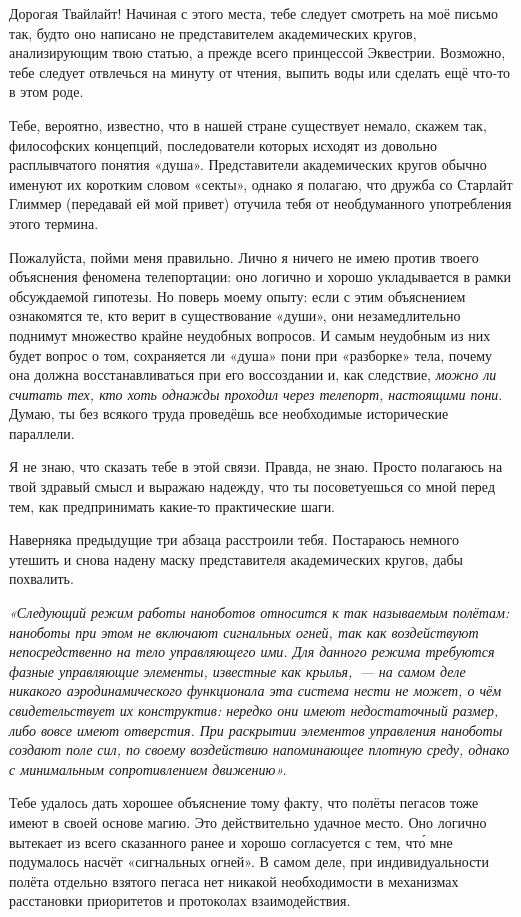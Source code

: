 \documentclass[fontsize=11pt,a5paper,titlepage=firstcover]{scrbook}
\begin{document}
Дорогая Твайлайт! Начиная с этого места, тебе следует смотреть на моё письмо так, будто оно написано не представителем академических кругов, анализирующим твою статью, а прежде всего принцессой Эквестрии. Возможно, тебе следует отвлечься на минуту от чтения, выпить воды или сделать ещё что-то в этом роде.

Тебе, вероятно, известно, что в нашей стране существует немало, скажем так, философских концепций, последователи которых исходят из довольно расплывчатого понятия «душа». Представители академических кругов обычно именуют их коротким словом «секты», однако я полагаю, что дружба со Старлайт Глиммер (передавай ей мой привет) отучила тебя от необдуманного употребления этого термина.

Пожалуйста, пойми меня правильно. Лично я ничего не имею против твоего объяснения феномена телепортации: оно логично и хорошо укладывается в рамки обсуждаемой гипотезы. Но поверь моему опыту: если с этим объяснением ознакомятся те, кто верит в существование «души», они незамедлительно поднимут множество крайне неудобных вопросов. И самым неудобным из них будет вопрос о том, сохраняется ли «душа» пони при «разборке» тела, почему она должна восстанавливаться при его воссоздании и, как следствие, \emph{можно ли считать тех, кто хоть однажды проходил через телепорт, настоящими пони}. Думаю, ты без всякого труда проведёшь все необходимые исторические параллели.

Я не знаю, что сказать тебе в этой связи. Правда, не знаю. Просто полагаюсь на твой здравый смысл и выражаю надежду, что ты посоветуешься со мной перед тем, как предпринимать какие-то практические шаги.

Наверняка предыдущие три абзаца расстроили тебя. Постараюсь немного утешить и снова надену маску представителя академических кругов, дабы похвалить.

\emph{«Следующий режим работы наноботов относится к так называемым полётам: наноботы при этом не включают сигнальных огней, так как воздействуют непосредственно на тело управляющего ими. Для данного режима требуются фазные управляющие элементы, известные как крылья,~--- на самом деле никакого аэродинамического функционала эта система нести не может, о чём свидетельствует их конструктив: нередко они имеют недостаточный размер, либо вовсе имеют отверстия. При раскрытии элементов управления наноботы создают поле сил, по своему воздействию напоминающее плотную среду, однако с минимальным сопротивлением движению».}

Тебе удалось дать хорошее объяснение тому факту, что полёты пегасов тоже имеют в своей основе магию. Это действительно удачное место. Оно логично вытекает из всего сказанного ранее и хорошо согласуется с тем, что́ мне подумалось насчёт «сигнальных огней». В самом деле, при индивидуальности полёта отдельно взятого пегаса нет никакой необходимости в механизмах расстановки приоритетов и протоколах взаимодействия.
\end{document}
